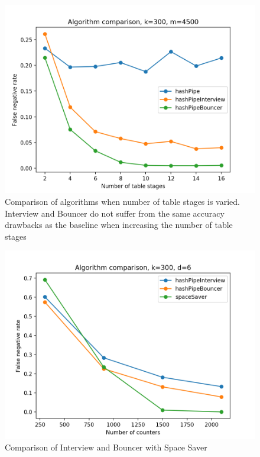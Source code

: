 \begin{figure}[t]
  \centering
    \includegraphics[scale=0.5]{stageComparison}
     \caption{Comparison of algorithms when number of table stages is varied. Interview and Bouncer do not suffer from the same accuracy drawbacks as the baseline when increasing the number of table stages}
     \label{fig:bp-image}
\end{figure}

\begin{figure}[t]
  \centering
    \includegraphics[scale=0.45]{spacesaver}
     \caption{Comparison of Interview and Bouncer with Space Saver}
     \label{fig:bp-image}
\end{figure}